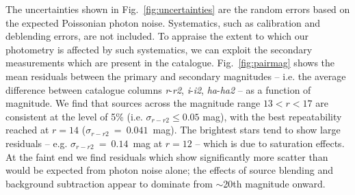 \documentclass[useAMS,usenatbib]{mn2e}
\begin{document}
The uncertainties shown in Fig.~\ref{fig:uncertainties}
are the random errors based on the expected Poissonian photon noise.
Systematics, such as calibration and deblending errors,
are not included.
To appraise the extent to which our photometry is affected
by such systematics, we can exploit the
secondary measurements which are present in the catalogue.
Fig.~\ref{fig:pairmag} shows the mean residuals between
the primary and secondary magnitudes
-- i.e. the average difference between catalogue columns \emph{r}-\emph{r2},
\emph{i}-\emph{i2}, \emph{ha}-\emph{ha2} -- as a function of magnitude.
We find that sources across the magnitude range 
$13 < r < 17$ are consistent at the level of 5\%
(i.e. $\sigma_{r-r2} \le 0.05$ mag),
with the best repeatability
reached at $r=14$ ($\sigma_{r-r2}~=~0.041$~mag).
The brightest stars tend to show large residuals
-- e.g. $\sigma_{r-r2}~=~0.14$~mag at $r=12$ --
which is due to saturation effects.
At the faint end we find residuals which
show significantly more scatter than would be expected
from photon noise alone;
the effects of source blending and background subtraction
appear to dominate from $\sim$20th magnitude onward.
\end{document}
